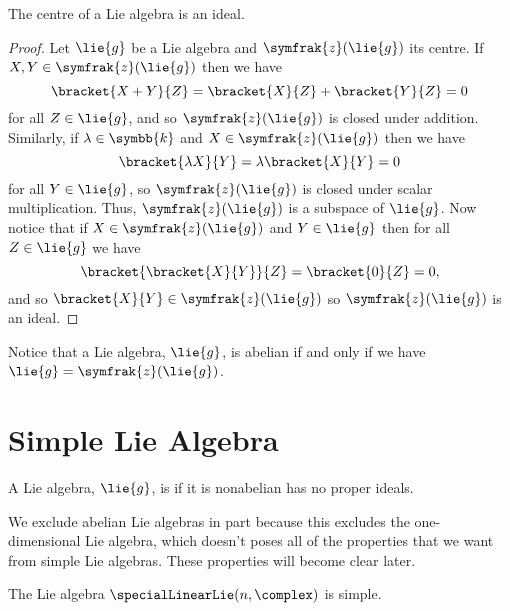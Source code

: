 \documentclass[fleqn]{NotesClass}
\renewcommand{\field}{\symbb{k}}
\newcommand{\centre}{\symfrak{z}}
\begin{document}
    \begin{lma}{}{}
        The centre of a Lie algebra is an ideal.
        \begin{proof}
            Let \(\lie{g}\) be a Lie algebra and \(\centre(\lie{g})\) its centre.
            If \(X, Y \in \centre(\lie{g})\) then we have
            \begin{equation}
                \bracket{X + Y}{Z} = \bracket{X}{Z} + \bracket{Y}{Z} = 0
            \end{equation}
            for all \(Z \in \lie{g}\), and so \(\centre(\lie{g})\) is closed under addition.
            Similarly, if \(\lambda \in \field\) and \(X \in \centre(\lie{g})\) then we have
            \begin{equation}
                \bracket{\lambda X}{Y} = \lambda \bracket{X}{Y} = 0
            \end{equation}
            for all \(Y \in \lie{g}\), so \(\centre(\lie{g})\) is closed under scalar multiplication.
            Thus, \(\centre(\lie{g})\) is a subspace of \(\lie{g}\).
            Now notice that if \(X \in \centre(\lie{g})\) and \(Y \in \lie{g}\) then for all \(Z \in \lie{g}\) we have
            \begin{equation}
                \bracket{\bracket{X}{Y}}{Z} = \bracket{0}{Z} = 0,
            \end{equation}
            and so \(\bracket{X}{Y} \in \centre(\lie{g})\) so \(\centre(\lie{g})\) is an ideal.
        \end{proof}
    \end{lma}
    
    Notice that a Lie algebra, \(\lie{g}\), is abelian if and only if we have \(\lie{g} = \centre(\lie{g})\).
    
    \section{Simple Lie Algebra}
    \begin{dfn}{}{}
        A Lie algebra, \(\lie{g}\), is  if it is nonabelian has no proper ideals.
    \end{dfn}
    
    We exclude abelian Lie algebras in part because this excludes the one-dimensional Lie algebra, which doesn't poses all of the properties that we want from simple Lie algebras.
    These properties will become clear later.
    
    \begin{exm}{}{}
        The Lie algebra \(\specialLinearLie(n, \complex)\) is simple.
    \end{exm}
    
\end{document}
